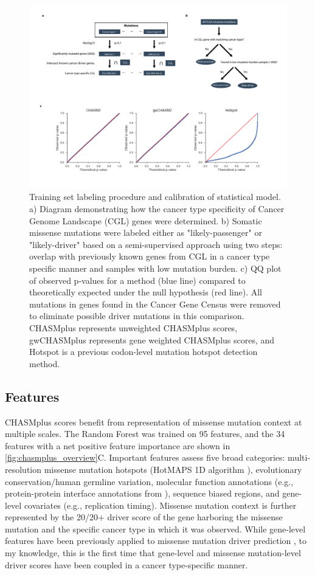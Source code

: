 \begin{figure}
  \centering
  \makeatletter
  \let\@currsize\normalsize
  \includegraphics[width=0.9\linewidth]{figures/chapter6/chasmplus_flow_diagram.pdf}
  \caption[Training set labeling procedure and calibration of statistical model]{Training set labeling procedure and calibration of statistical model. a) Diagram demonstrating how the cancer type specificity of Cancer Genome Landscape (CGL) genes were determined. b) Somatic missense mutations were labeled either as "likely-passenger" or "likely-driver" based on a semi-supervised approach using two steps: overlap with previously known genes from CGL in a cancer type specific manner and samples with low mutation burden. c) QQ plot of observed p-values for a method (blue line) compared to theoretically expected under the null hypothesis (red line). All mutations in genes found in the Cancer Gene Census were removed to eliminate possible driver mutations in this comparison. CHASMplus represents unweighted CHASMplus scores, gwCHASMplus represents gene weighted CHASMplus scores, and Hotspot is a previous codon-level mutation hotspot detection method.}
  \label{fig:chasmplus_flow_diagram}
\end{figure}

\subsection{Features}
CHASMplus scores benefit from representation of missense mutation context at multiple scales. The Random Forest was trained on 95 features, and the 34 features with a net positive feature importance are shown in \autoref{fig:chasmplus_overview}C. Important features assess five broad categories: multi-resolution missense mutation hotspots (HotMAPS 1D algorithm \cite{RN60}), evolutionary conservation/human germline variation, molecular function annotations (e.g., protein-protein interface annotations from \cite{RN139}), sequence biased regions, and gene-level covariates (e.g., replication timing). Missense mutation context is further represented by the 20/20+ driver score of the gene harboring the missense mutation and the specific cancer type in which it was observed.  While gene-level features have been previously applied to missense mutation driver prediction \cite{RN35}, to my knowledge, this is the first time that gene-level and missense mutation-level driver scores have been coupled in a cancer type-specific manner.  

